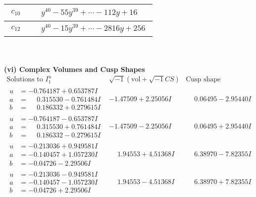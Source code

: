 \documentclass[1p]{elsarticle_modified}
\theoremstyle{definition}
\newcommand{\I}{\sqrt{-1}}
\begin{document}
\begin{tabular}{m{50pt}|m{274pt}}
\hline $$\begin{aligned}c_{10}\end{aligned}$$&$\begin{aligned}
&y^{40}-55 y^{39}+\cdots-112 y+16
\end{aligned}$\\
\hline $$\begin{aligned}c_{12}\end{aligned}$$&$\begin{aligned}
&y^{40}-15 y^{39}+\cdots-2816 y+256
\end{aligned}$\\
\hline
\end{tabular}\\~\\
\newpage\flushleft \textbf{(vi) Complex Volumes and Cusp Shapes}
$$\begin{array}{c|c|c}  
\text{Solutions to }I^u_{1}& \I (\text{vol} + \sqrt{-1}CS) & \text{Cusp shape}\\
 \hline 
\begin{aligned}
u &= -0.764187 + 0.653787 I \\
a &= \phantom{-}0.315530 - 0.761484 I \\
b &= \phantom{-}0.186332 + 0.279615 I\end{aligned}
 & -1.47509 + 2.25056 I & \phantom{-}0.06495 - 2.95440 I \\ \hline\begin{aligned}
u &= -0.764187 - 0.653787 I \\
a &= \phantom{-}0.315530 + 0.761484 I \\
b &= \phantom{-}0.186332 - 0.279615 I\end{aligned}
 & -1.47509 - 2.25056 I & \phantom{-}0.06495 + 2.95440 I \\ \hline\begin{aligned}
u &= -0.213036 + 0.949581 I \\
a &= -0.140457 + 1.057230 I \\
b &= -0.04726 - 2.29506 I\end{aligned}
 & \phantom{-}1.94553 + 4.51368 I & \phantom{-}6.38970 - 7.82355 I \\ \hline\begin{aligned}
u &= -0.213036 - 0.949581 I \\
a &= -0.140457 - 1.057230 I \\
b &= -0.04726 + 2.29506 I\end{aligned}
 & \phantom{-}1.94553 - 4.51368 I & \phantom{-}6.38970 + 7.82355 I \\ \hline\begin{aligned}

\end{aligned}
\end{array}$$
\end{document}

